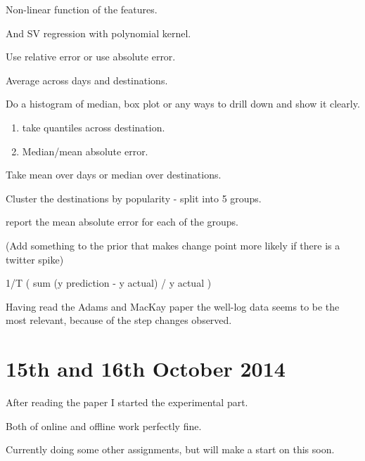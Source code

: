 \documentclass[11pt]{amsart}
\begin{document}
Non-linear function of the features.

And SV regression with polynomial kernel.

Use relative error or use absolute error.

Average across days and destinations. 

Do a histogram of median, box plot or any ways to drill down and show it clearly.
\begin{enumerate}
\item take quantiles across destination. 
\item Median/mean absolute error.
\end{enumerate}

Take mean over days or median over destinations.

Cluster the destinations by popularity - split into 5 groups.

report the mean absolute error for each of the groups.

(Add something to the prior that makes change point more likely if there is a twitter spike)

1/T ( sum (y prediction - y actual) / y actual )


Having read the Adams and MacKay paper the well-log data seems to be the most relevant, because of the step changes observed.

\section{15th  and 16th October 2014}

After reading the paper I started the experimental part. 

Both of online and offline work perfectly fine.

Currently doing some other assignments, but will make a start on this soon.
\end{document}
